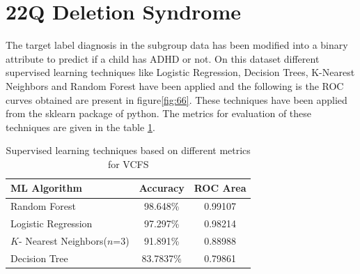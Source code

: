 \section{22Q Deletion Syndrome}
The target label diagnosis in the subgroup data has been modified into a binary attribute to predict if a child has ADHD or not. On this dataset different supervised learning techniques like Logistic Regression, Decision Trees, K-Nearest Neighbors and Random Forest have been applied and the following is the ROC curves obtained are present in figure\ref{fig:66}. These techniques have been applied from the sklearn package of python. The metrics for evaluation of these techniques are given in the table \ref{table:613}. 
\begin{table}[h]
\begin{center}
\begin{tabular}{|l|c|c|}
\hline
\textbf{ML Algorithm} & \textbf{Accuracy}&	\textbf{ROC Area}\\
\hline \hline
Random Forest&	98.648\%&	0.99107\\
\hline
Logistic Regression&	97.297\%&	0.98214\\
\hline
$K$- Nearest Neighbors($n$=3)&91.891\%	&0.88988\\
\hline
Decision Tree&	83.7837\%&	0.79861\\
\hline
\end{tabular}
\end{center}
\caption{Supervised learning techniques based on different metrics for VCFS }
\label{table:613}
\end{table}

